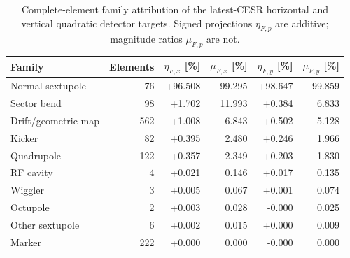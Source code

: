 \begin{table}[!htb]
  \centering
  \caption{Complete-element family attribution of the latest-CESR horizontal and vertical quadratic detector targets. Signed projections $\eta_{F,p}$ are additive; magnitude ratios $\mu_{F,p}$ are not.}
  \scriptsize
  \setlength{\tabcolsep}{4pt}
  \begin{tabular}{lrrrrr}
    \toprule
    Family & Elements & $\eta_{F,x}$ [\%] & $\mu_{F,x}$ [\%] & $\eta_{F,y}$ [\%] & $\mu_{F,y}$ [\%] \\
    \midrule
    Normal sextupole & 76 & +96.508 & 99.295 & +98.647 & 99.859 \\
    Sector bend & 98 & +1.702 & 11.993 & +0.384 & 6.833 \\
    Drift/geometric map & 562 & +1.008 & 6.843 & +0.502 & 5.128 \\
    Kicker & 82 & +0.395 & 2.480 & +0.246 & 1.966 \\
    Quadrupole & 122 & +0.357 & 2.349 & +0.203 & 1.830 \\
    RF cavity & 4 & +0.021 & 0.146 & +0.017 & 0.135 \\
    Wiggler & 3 & +0.005 & 0.067 & +0.001 & 0.074 \\
    Octupole & 2 & +0.003 & 0.028 & -0.000 & 0.025 \\
    Other sextupole & 6 & +0.002 & 0.015 & +0.000 & 0.009 \\
    Marker & 222 & +0.000 & 0.000 & -0.000 & 0.000 \\
    \bottomrule
  \end{tabular}
  \label{tab:latest-cesr-element-families}
\end{table}

